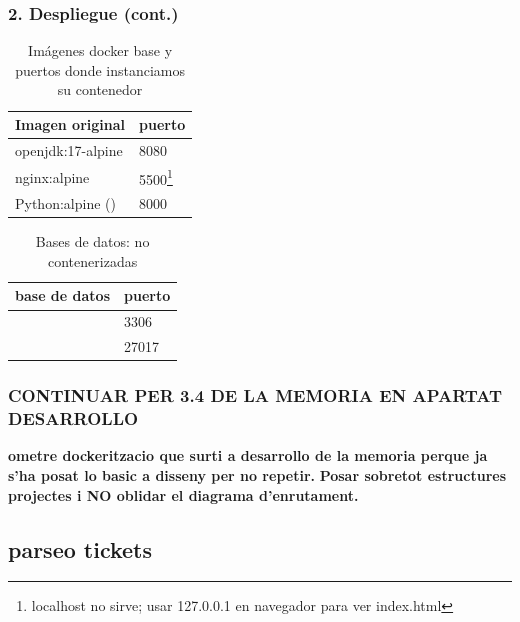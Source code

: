 \documentclass{beamer}
\begin{document}
	
	\begin{frame}
		\frametitle{2. Despliegue (cont.)}
		
		
		\begin{table}[h!]
			\centering
			\begin{tabular}{|l|l|}
				\hline
				\textbf{Imagen original} & \textbf{puerto} \\
				\hline
				
				openjdk:17-alpine & 8080 \\
				nginx:alpine & 5500\footnote{localhost no sirve; usar 127.0.0.1 en navegador para ver index.html} \\
				Python:alpine (\href{https://shorturl.at/YdNuy}{\color{blue}{DF}}) & 8000 \\
		
				\hline
			\end{tabular}
			\caption{Imágenes docker base y puertos donde instanciamos su contenedor}
		\end{table}		
	
	
		\begin{table}[h!]
		\centering
			\begin{tabular}{|l|l|}
				\hline
				\textbf{base de datos} & \textbf{puerto} \\
				\hline
				
				\color{red}{MySQL} & 3306 \\
				\color{red}{MongoDB} & 27017 \\
		
				\hline
			\end{tabular}
			\caption{Bases de datos: no contenerizadas}
		\end{table}		
	\end{frame}
	
	
	
	
	\begin{frame}
		\frametitle{CONTINUAR PER 3.4 DE LA MEMORIA EN APARTAT DESARROLLO}
		\textbf{ometre dockeritzacio que surti a desarrollo de la memoria perque ja s'ha posat lo basic a disseny per no repetir.}
		\textbf{Posar sobretot estructures projectes i NO oblidar el diagrama d'enrutament.}
	\end{frame}
	
	
	
	
	
	\subsection{parseo tickets}
	
\end{document}
